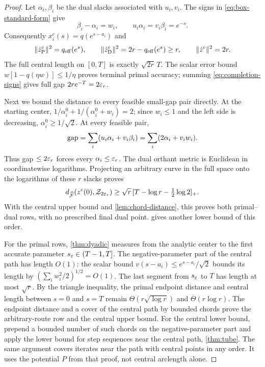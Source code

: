 \begin{proof}
Let $\alpha_i,\beta_i$ be the dual slacks associated with $u_i,v_i$.
The signs in \eqref{eq:box-standard-form} give
\begin{equation}
 \beta_i-\alpha_i=w_i,\qquad
 u_i\alpha_i=v_i\beta_i=e^{-s}.
 \label{eq:completion-signs}
\end{equation}
Consequently $x_i^c(s)=q(e^{s-a_i})$ and
\begin{equation}
 \lVert \dot z_{\rm P}^c\rVert^2=q_{\rm eff}(e^s),\qquad
 \lVert \dot z_{\rm D}^c\rVert^2=2r-q_{\rm eff}(e^s)\geq r,
 \qquad \lVert \dot z^c\rVert^2=2r.
 \label{eq:completion-speeds}
\end{equation}
The full central length on $[0,T]$ is exactly $\sqrt{2r}\,T$.
The scalar error bound $w[1-q(\eta w)]\leq1/\eta$ proves terminal
primal accuracy; summing \eqref{eq:completion-signs} gives full gap
$2re^{-T}=2\varepsilon_r$.

Next we bound the distance to every feasible small-gap pair directly.
At the starting center,
$1/\alpha_i^0+1/(\alpha_i^0+w_i)=2$; since $w_i\leq1$ and the left side
is decreasing, $\alpha_i^0\geq1/\sqrt2$. At every feasible
pair,
\[
 \operatorname{gap}=\sum_i(u_i\alpha_i+v_i\beta_i)
      =\sum_i(2\alpha_i+v_iw_i).
\]
Thus gap $\leq2\varepsilon_r$ forces every $\alpha_i\leq\varepsilon_r$.
The dual orthant metric is Euclidean in coordinatewise logarithms.
Projecting an arbitrary curve in the full space onto the logarithms
of these $r$ slacks proves
\begin{equation}
 d_{\widehat{\mathcal F}}(z^c(0),\mathcal Z_{2\varepsilon_r})
 \geq\sqrt r\,[T-\log r-\tfrac12\log2]_+.
 \label{eq:completion-gap-lower}
\end{equation}
With the central upper bound and \cref{lem:chord-distance}, this
proves both primal--dual rows, with no prescribed final dual point.
 gives another lower bound of this order.

For the primal rows, \cref{thm:dyadic} measures from the
analytic center to the first accurate parameter $s_\varepsilon\in(T-1,T]$.
The negative-parameter part of the central path has length $O(1)$:
the scalar bound
$v(s-a_i)\leq e^{s-a_i}/\sqrt2$ bounds its length by
$(\sum_iw_i^2/2)^{1/2}=O(1)$.
The last segment from $s_\varepsilon$ to $T$ has length at most $\sqrt r$.
By the triangle inequality, the primal endpoint distance and central
length between $s=0$ and $s=T$ remain $\Theta(r\sqrt{\log r})$ and
$\Theta(r\log r)$. The endpoint distance and a cover of the central
path by bounded chords prove the arbitrary-route row and the central
upper bound. For the central lower bound, prepend a bounded number of
such chords on the negative-parameter part and apply the lower bound
for step sequences near the central path, \cref{thm:tube}. The same argument covers
iterates near the path with central points in any order.
It uses the potential $P$ from that proof, not central arclength alone.
\end{proof}
